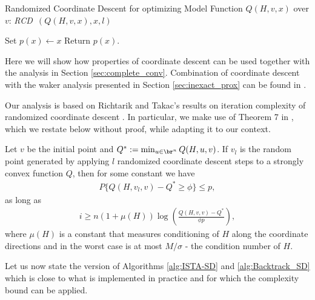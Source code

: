 \documentclass[11pt]{article}
\numberwithin{equation}{section}
\begin{document}
\begin{algorithm2e}\caption{Randomized Coordinate Descent for optimizing Model Function $Q(H, v, x)$ over $v$: {\em RCD\ }$(Q(H, v, x), x, l)$ }
    \label{alg:randomized_cd}%
Set $p(x) \gets x $\; 
Return $p(x)$.
\end{algorithm2e}







Here we will show how properties of coordinate descent can be used together with the analysis in Section \ref{sec:complete_conv}. Combination of
coordinate descent with the waker analysis presented in Section \ref{sec:inexact_prox} can be found in \cite{OML}. 

Our analysis is based on Richtarik and Takac's results on iteration complexity of randomized coordinate descent  \cite{Richtarik2012}. In particular, we make use of Theorem 7 in \cite{Richtarik2012}, which we restate below without proof, while adapting it to our context.

\begin{lemma}\label{lem:randomized_CD}

Let $v$ be the initial point and $Q^* := \min_{u\in\br^n} Q(H, u,v)$. If $v_l$ is the random point generated by applying $l$ randomized coordinate descent steps to a strongly convex function $Q$, then for some constant 
we have
\begin{align*}
    P\{Q(H,v_l,v) - Q^*\geq \phi\} \leq p, 
\end{align*}
as long as 
\begin{align*}
i\geq n(1+\mu(H)) \log(\frac{Q(H,v,v) - Q^*}{\phi p}),
\end{align*}
where $\mu(H)$ is a constant that measures conditioning of $H$ along the coordinate directions and in the worst case is at most $M/\sigma$ - the condition 
number of $H$.
\end{lemma}

Let us now state the version of  Algorithms \ref{alg:ISTA-SD} and \ref{alg:Backtrack_SD} which is close to what  is implemented in practice and 
 for which the complexity  bound can be applied.
\end{document}
